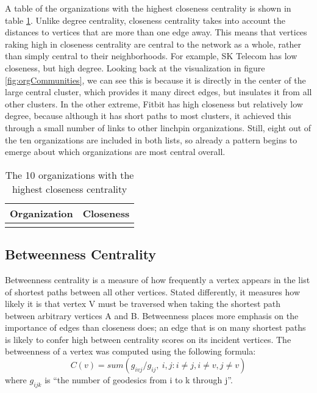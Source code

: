 A table of the organizations with the highest closeness centrality is shown in table \ref{tab:closeness}. Unlike degree centrality, closeness centrality takes into account the distances to vertices that are more than one edge away. This means that vertices raking high in closeness centrality are central to the network as a whole, rather than simply central to their neighborhoods. For example, SK Telecom has low closeness, but high degree. Looking back at the visualization in figure \ref{fig:orgCommunities}, we can see this is because it is directly in the center of the large central cluster, which provides it many direct edges, but insulates it from all other clusters. In the other extreme, Fitbit has high closeness but relatively low degree, because although it has short paths to most clusters, it achieved this through a small number of links to other linchpin organizations. Still, eight out of the ten organizations are included in both lists, so already a pattern begins to emerge about which organizations are most central overall.

\begin{table}
	\begin{tabular}{l|c}%
		\bfseries Organization & \bfseries Closeness%
		\csvreader[head to column names]{closeness.csv}{}%
		{\\\hline\organizationb & \scoreb}%
	\end{tabular}
	\centering
	\caption{The 10 organizations with the highest closeness centrality}\label{tab:closeness}
\end{table}

\subsection{Betweenness Centrality}
Betweenness centrality is a measure of how frequently a vertex appears in the list of shortest paths between all other vertices. Stated differently, it measures how likely it is that vertex V must be traversed when taking the shortest path between arbitrary vertices A and B. Betweenness places more emphasis on the importance of edges than closeness does; an edge that is on many shortest paths is likely to confer high between centrality scores on its incident vertices. The betweenness of a vertex was computed using the following formula:
\begin{equation*}
C(v) = sum( g_{ivj} / g_{ij},\:i,j: i \neq j,i \neq v,j \neq v )
\end{equation*}
where $g_{ijk}$ is ``the number of geodesics from i to k through j''\cite{butts}. 

